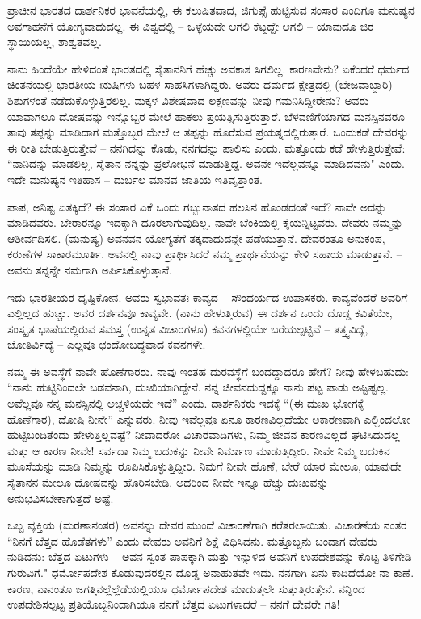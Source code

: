 ಪ್ರಾಚೀನ ಭಾರತದ ದಾರ್ಶನಿಕರ ಭಾವನೆಯಲ್ಲಿ, ಈ ಕಲುಷಿತವಾದ, ಜಿಗುಪ್ಸೆ ಹುಟ್ಟಿಸುವ ಸಂಸಾರ ಎಂದಿಗೂ ಮನುಷ್ಯನ ಅವಗಾಹನೆಗೆ ಯೋಗ್ಯವಾದುದಲ್ಲ. ಈ ವಿಶ್ವದಲ್ಲಿ – ಒಳ್ಳೆಯದೇ ಆಗಲಿ ಕೆಟ್ಟದ್ದೇ ಆಗಲಿ – ಯಾವುದೂ ಚಿರ ಸ್ಥಾಯಿಯಲ್ಲ, ಶಾಶ್ವತವಲ್ಲ.

ನಾನು ಹಿಂದೆಯೇ ಹೇಳಿದಂತೆ ಭಾರತದಲ್ಲಿ ಸೈತಾನನಿಗೆ ಹೆಚ್ಚು ಅವಕಾಶ ಸಿಗಲಿಲ್ಲ. ಕಾರಣವೇನು? ಏಕೆಂದರೆ ಧರ್ಮದ ಚಿಂತನೆಯಲ್ಲಿ ಭಾರತೀಯ ಋಷಿಗಳು ಬಹಳ ಸಾಹಸಿಗಳಾಗಿದ್ದರು. ಅವರು ಧರ್ಮದ ಕ್ಷೇತ್ರದಲ್ಲಿ (ಬೇಜವಾಬ್ದಾರಿ) ಶಿಶುಗಳಂತೆ ನಡೆದುಕೊಳ್ಳುತ್ತಿರಲಿಲ್ಲ. ಮಕ್ಕಳ ವಿಶೇಷವಾದ ಲಕ್ಷಣವನ್ನು ನೀವು ಗಮನಿಸಿದ್ದೀರೇನು? ಅವರು ಯಾವಾಗಲೂ ದೋಷವನ್ನು ಇನ್ನೊಬ್ಬರ ಮೇಲೆ ಹಾಕಲು ಪ್ರಯತ್ನಿಸುತ್ತಿರುತ್ತಾರೆ. ಬೆಳವಣಿಗೆಯಾಗದ ಮನಸ್ಸಿನವರೂ ತಾವು ತಪ್ಪನ್ನು ಮಾಡಿದಾಗ ಮತ್ತೊಬ್ಬರ ಮೇಲೆ ಆ ತಪ್ಪನ್ನು ಹೊರೆಸುವ ಪ್ರಯತ್ನದಲ್ಲಿರುತ್ತಾರೆ. ಒಂದುಕಡೆ ದೇವರನ್ನು ಈ ರೀತಿ ಬೇಡುತ್ತಿರುತ್ತೇವೆ – ನನಗಿದನ್ನು ಕೊಡು, ನನಗದನ್ನು ಪಾಲಿಸು ಎಂದು. ಮತ್ತೊಂದು ಕಡೆ ಹೇಳುತ್ತಿರುತ್ತೇವೆ: “ನಾನಿದನ್ನು ಮಾಡಲಿಲ್ಲ, ಸೈತಾನ ನನ್ನನ್ನು ಪ್ರಲೋಭನೆ ಮಾಡುತ್ತಿದ್ದ. ಅವನೇ ಇದೆಲ್ಲವನ್ನೂ ಮಾಡಿದವನು" ಎಂದು. ಇದೇ ಮನುಷ್ಯನ ಇತಿಹಾಸ – ದುರ್ಬಲ ಮಾನವ ಜಾತಿಯ ಇತಿವೃತ್ತಾಂತ.

ಪಾಪ, ಅನಿಷ್ಟ ಏತಕ್ಕಿದೆ? ಈ ಸಂಸಾರ ಏಕೆ ಒಂದು ಗಬ್ಬುನಾತದ ಹಲಸಿನ ಹೊಂಡದಂತೆ ಇದೆ? ನಾವೇ ಅದನ್ನು ಮಾಡಿದವರು. ಬೇರಾರನ್ನೂ ಇದಕ್ಕಾಗಿ ದೂರಲಾಗುವುದಿಲ್ಲ. ನಾವೇ ಬೆಂಕಿಯಲ್ಲಿ ಕೈಯನ್ನಿಟ್ಟವರು. ದೇವರು ನಮ್ಮನ್ನು ಆಶೀರ್ವದಿಸಲಿ. (ಮನುಷ್ಯ) ಅವನವನ ಯೋಗ್ಯತೆಗೆ ತಕ್ಕದಾದುದನ್ನೇ ಪಡೆಯುತ್ತಾನೆ. ದೇವರಂತೂ ಅನುಕಂಪ, ಕರುಣೆಗಳ ಸಾಕಾರಮೂರ್ತಿ. ಅವನಲ್ಲಿ ನಾವು ಪ್ರಾರ್ಥಿಸಿದರೆ ನಮ್ಮ ಪ್ರಾರ್ಥನೆಯನ್ನು ಕೇಳಿ ಸಹಾಯ ಮಾಡುತ್ತಾನೆ. – ಅವನು ತನ್ನನ್ನೇ ನಮಗಾಗಿ ಅರ್ಪಿಸಿಕೊಳ್ಳುತ್ತಾನೆ.

ಇದು ಭಾರತೀಯರ ದೃಷ್ಟಿಕೋನ. ಅವರು ಸ್ವಭಾವತಃ ಕಾವ್ಯದ – ಸೌಂದರ್ಯದ ಉಪಾಸಕರು. ಕಾವ್ಯವೆಂದರೆ ಅವರಿಗೆ ಎಲ್ಲಿಲ್ಲದ ಹುಚ್ಚು. ಅವರ ದರ್ಶನವೂ ಕಾವ್ಯವೇ. (ನಾನು ಹೇಳುತ್ತಿರುವ) ಈ ದರ್ಶನ ಒಂದು ದೊಡ್ಡ ಕವಿತೆಯೇ, ಸಂಸ್ಕೃತ ಭಾಷೆಯಲ್ಲಿರುವ ಸಮಸ್ತ (ಉನ್ನತ ವಿಚಾರಗಳೂ) ಕವನಗಳಲ್ಲಿಯೇ ಬರೆಯಲ್ಪಟ್ಟಿವೆ – ತತ್ತ್ವವಿದ್ಯೆ, ಜೋತಿರ್ವಿದ್ಯೆ – ಎಲ್ಲವೂ ಛಂದೋಬದ್ಧವಾದ ಕವನಗಳೇ.

ನಮ್ಮ ಈ ಅವಸ್ಥೆಗೆ ನಾವೇ ಹೊಣೆಗಾರರು. ನಾವು ಇಂತಹ ದುರವಸ್ಥೆಗೆ ಬಂದದ್ದಾದರೂ ಹೇಗೆ? ನೀವು ಹೇಳಬಹುದು: “ನಾನು ಹುಟ್ಟಿನಿಂದಲೇ ಬಡವನಾಗಿ, ದುಃಖಿಯಾಗಿದ್ದೇನೆ. ನನ್ನ ಜೀವನದುದ್ದಕ್ಕೂ ನಾನು ಪಟ್ಟ ಪಾಡು ಅಷ್ಟಿಷ್ಟಲ್ಲ. ಅವೆಲ್ಲವೂ ನನ್ನ ಮನಸ್ಸಿನಲ್ಲಿ ಅಚ್ಚಳಿಯದೇ ಇದೆ'' ಎಂದು. ದಾರ್ಶನಿಕರು ಇದಕ್ಕೆ “(ಈ ದುಃಖ ಭೋಗಕ್ಕೆ ಹೊಣೆಗಾರ), ದೋಷಿ ನೀನೇ'' ಎನ್ನುವರು. ನೀವು ಇವೆಲ್ಲವೂ ಏನೂ ಕಾರಣವಿಲ್ಲದೆಯೇ ಅಕಾರಣವಾಗಿ ಎಲ್ಲಿಂದಲೋ ಹುಟ್ಟಿಬಂದಿತೆಂದು ಹೇಳುತ್ತಿಲ್ಲವಷ್ಟೆ? ನೀವಾದರೋ ವಿಚಾರವಾದಿಗಳು, ನಿಮ್ಮ ಜೀವನ ಕಾರಣವಿಲ್ಲದೆ ಘಟಿಸಿದುದಲ್ಲ ಮತ್ತು ಆ ಕಾರಣ ನೀವೇ! ಸರ್ವದಾ ನಿಮ್ಮ ಬದುಕನ್ನು ನೀವೇ ನಿರ್ಮಾಣ ಮಾಡುತ್ತಿದ್ದೀರಿ. ನೀವೇ ನಿಮ್ಮ ಬದುಕಿನ ಮೂಸೆಯನ್ನು ಮಾಡಿ ನಿಮ್ಮನ್ನು ರೂಪಿಸಿಕೊಳ್ಳುತ್ತಿದ್ದೀರಿ. ನಿಮಗೆ ನೀವೇ ಹೊಣೆ, ಬೇರೆ ಯಾರ ಮೇಲೂ, ಯಾವುದೇ ಸೈತಾನನ ಮೇಲೂ ದೋಷವನ್ನು ಹೊರಿಸಬೇಡಿ. ಅದರಿಂದ ನೀವೇ ಇನ್ನೂ ಹೆಚ್ಚು ದುಃಖವನ್ನು ಅನುಭವಿಸಬೇಕಾಗುತ್ತದೆ ಅಷ್ಟೆ.

ಒಬ್ಬ ವ್ಯಕ್ತಿಯ (ಮರಣಾನಂತರ) ಅವನನ್ನು ದೇವರ ಮುಂದೆ ವಿಚಾರಣೆಗಾಗಿ ಕರೆತರಲಾಯಿತು. ವಿಚಾರಣೆಯ ನಂತರ “ನಿನಗೆ  ಬೆತ್ತದ ಹೊಡೆತಗಳು'' ಎಂದು ದೇವರು ಅವನಿಗೆ ಶಿಕ್ಷೆ ವಿಧಿಸಿದನು. ಮತ್ತೊಬ್ಬನು ಬಂದಾಗ ದೇವರು ನುಡಿದನು:  ಬೆತ್ತದ ಏಟುಗಳು –  ಅವನ ಸ್ವಂತ ಪಾಪಕ್ಕಾಗಿ ಮತ್ತು ಇನ್ನುಳಿದ  ಅವನಿಗೆ ಉಪದೇಶವನ್ನು ಕೊಟ್ಟ ತಿಳಿಗೇಡಿ ಗುರುವಿಗೆ." ಧರ್ಮೋಪದೇಶ ಕೊಡುವುದರಲ್ಲಿನ ದೊಡ್ಡ ಅನಾಹುತವೇ ಇದು. ನನಗಾಗಿ ಏನು ಕಾದಿದೆಯೋ ನಾ ಕಾಣೆ. ಕಾರಣ, ನಾನಂತೂ ಜಗತ್ತಿನಲ್ಲೆಲ್ಲೆಡೆಯಲ್ಲಿಯೂ ಧರ್ಮೋಪದೇಶ ಮಾಡುತ್ತಲೇ ಸುತ್ತುತ್ತಿರುತ್ತೇನೆ. ನನ್ನಿಂದ ಉಪದೇಶಿಸಲ್ಪಟ್ಟ ಪ್ರತಿಯೊಬ್ಬನಿಂದಾಗಿಯೂ ನನಗೆ  ಬೆತ್ತದ ಏಟುಗಳಾದರೆ – ನನಗೆ ದೇವರೇ ಗತಿ!

